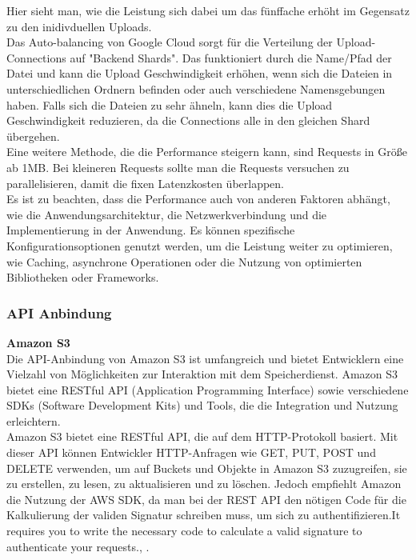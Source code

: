 Hier sieht man, wie die Leistung sich dabei um das fünffache erhöht im Gegensatz zu den inidivduellen Uploads.\\

Das Auto-balancing von Google Cloud sorgt für die Verteilung der Upload-Connections auf "Backend Shards". Das funktioniert durch die Name/Pfad der Datei und kann die Upload Geschwindigkeit erhöhen, wenn sich die Dateien in unterschiedlichen Ordnern befinden oder auch verschiedene Namensgebungen haben. Falls sich die Dateien zu sehr ähneln, kann dies die Upload Geschwindigkeit reduzieren, da die Connections alle in den gleichen Shard übergehen.\\

Eine weitere Methode, die die Performance steigern kann, sind Requests in Größe ab 1MB. Bei kleineren Requests sollte man die Requests versuchen zu parallelisieren, damit die fixen Latenzkosten überlappen.\\

Es ist zu beachten, dass die Performance auch von anderen Faktoren abhängt, wie die Anwendungsarchitektur, die Netzwerkverbindung und die Implementierung in der Anwendung. Es können spezifische Konfigurationsoptionen genutzt werden, um die Leistung weiter zu optimieren, wie Caching, asynchrone Operationen oder die Nutzung von optimierten Bibliotheken oder Frameworks. 

\newpage

\subsubsection{API Anbindung}

\textbf{Amazon S3}\\

Die API-Anbindung von Amazon S3 ist umfangreich und bietet Entwicklern eine Vielzahl von Möglichkeiten zur Interaktion mit dem Speicherdienst. Amazon S3 bietet eine RESTful API (Application Programming Interface) sowie verschiedene SDKs (Software Development Kits) und Tools, die die Integration und Nutzung erleichtern.\\

Amazon S3 bietet eine RESTful API, die auf dem HTTP-Protokoll basiert. Mit dieser API können Entwickler HTTP-Anfragen wie GET, PUT, POST und DELETE verwenden, um auf Buckets und Objekte in Amazon S3 zuzugreifen, sie zu erstellen, zu lesen, zu aktualisieren und zu löschen. Jedoch empfiehlt Amazon die Nutzung der AWS SDK, da man bei der REST API den nötigen Code für die Kalkulierung der validen Signatur schreiben muss, um sich zu authentifizieren.\glqq It requires you to write the necessary code to calculate a valid signature to authenticate your requests.\grqq, \cite{aws-api}.\\

